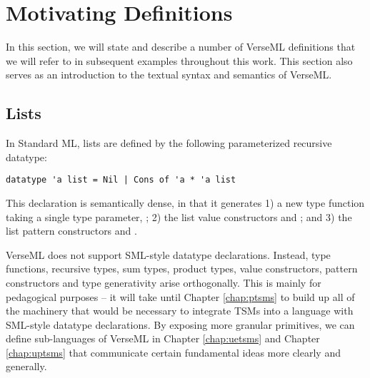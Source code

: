 \section{Motivating Definitions}\label{sec:motivating-examples}
In this section, we will state and describe a number of VerseML definitions that we will refer to in subsequent examples throughout this work. This section also serves as an introduction to the textual syntax and semantics of VerseML.

\subsection{Lists}\label{sec:lists}
In Standard ML, lists are defined by the following parameterized recursive datatype:
\begin{lstlisting}[numbers=none]
datatype 'a list = Nil | Cons of 'a * 'a list
\end{lstlisting}
This declaration is semantically dense, in that it generates 1) a new type function  taking a single type parameter, ; 2) the list value constructors  and ; and 3) the list pattern constructors  and .

VerseML does not support SML-style datatype declarations. Instead, type functions, recursive types, sum types, product types, value constructors, pattern constructors and type generativity arise orthogonally. This is mainly for pedagogical purposes -- it will take until Chapter \ref{chap:ptsms} to build up all of the machinery that would be necessary to integrate TSMs into a language with SML-style datatype declarations. By exposing more granular primitives, we can define sub-languages of VerseML in Chapter \ref{chap:uetsms} and Chapter \ref{chap:uptsms} that communicate certain fundamental ideas more clearly and generally.

